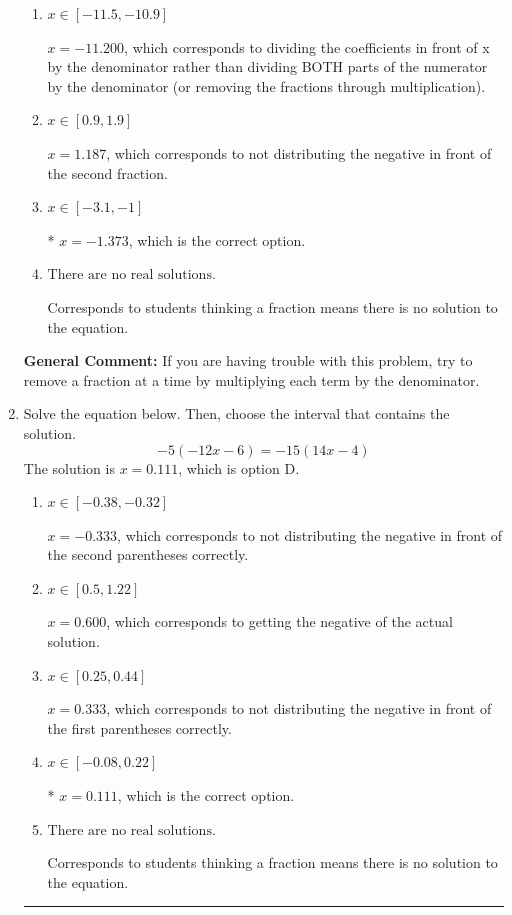 \documentclass{extbook}[14pt]
\newcommand{\litem}[1]{\item #1

\rule{\textwidth}{0.4pt}}
\begin{document}
\begin{enumerate}
{\begin{enumerate}[label=\Alph*.]
 $x = -0.204$, which corresponds to dividing the second number in the numerator by the denominator rather than dividing BOTH parts of the numerator by the denominator (or removing the fractions through multiplication).
\item \( x \in [-11.5, -10.9] \)

 $x = -11.200$, which corresponds to dividing the coefficients in front of x by the denominator rather than dividing BOTH parts of the numerator by the denominator (or removing the fractions through multiplication).
\item \( x \in [0.9, 1.9] \)

 $x = 1.187$, which corresponds to not distributing the negative in front of the second fraction.
\item \( x \in [-3.1, -1] \)

* $x = -1.373$, which is the correct option.
\item \( \text{There are no real solutions.} \)

Corresponds to students thinking a fraction means there is no solution to the equation.
\end{enumerate}

\textbf{General Comment:} If you are having trouble with this problem, try to remove a fraction at a time by multiplying each term by the denominator.
}
\litem{
Solve the equation below. Then, choose the interval that contains the solution.
\[ -5(-12x -6) = -15(14x -4) \]The solution is \( x = 0.111 \), which is option D.\begin{enumerate}[label=\Alph*.]
\item \( x \in [-0.38, -0.32] \)

$x = -0.333$, which corresponds to not distributing the negative in front of the second parentheses correctly.
\item \( x \in [0.5, 1.22] \)

$x = 0.600$, which corresponds to getting the negative of the actual solution.
\item \( x \in [0.25, 0.44] \)

$x = 0.333$, which corresponds to not distributing the negative in front of the first parentheses correctly.
\item \( x \in [-0.08, 0.22] \)

* $x = 0.111$, which is the correct option.
\item \( \text{There are no real solutions.} \)

Corresponds to students thinking a fraction means there is no solution to the equation.
\end{enumerate}

}
\end{enumerate}
\end{document}
